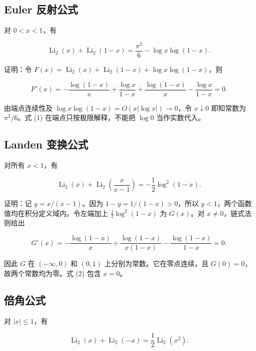 \documentclass[11pt,a4paper]{article}
\begin{document}
\hypertarget{euler-ux53cdux5c04ux516cux5f0f}{%
\subsection{Euler 反射公式}\label{euler-ux53cdux5c04ux516cux5f0f}}

对 \(0<x<1\)，有

\begin{equation}
\operatorname{Li}_2(x)+\operatorname{Li}_2(1-x)
=\frac{\pi^2}{6}-\log x\log(1-x).
\tag{1}
\end{equation}

证明：令 \(F(x)=\operatorname{Li}_2(x)+\operatorname{Li}_2(1-x)+\log x\log(1-x)\)，则

\[
F'(x)=-\frac{\log(1-x)}x+\frac{\log x}{1-x}
+\frac{\log(1-x)}x-\frac{\log x}{1-x}=0.
\]

由端点连续性及 \(\log x\log(1-x)=O(x|\log x|)\to0\)，令 \(x\downarrow0\) 即知常数为 \(\pi^2/6\)。式 (1) 在端点只按极限解释，不能把 \(\log0\) 当作实数代入。

\hypertarget{landen-ux53d8ux6362ux516cux5f0f}{%
\subsection{Landen 变换公式}\label{landen-ux53d8ux6362ux516cux5f0f}}

对所有 \(x<1\)，有

\begin{equation}
\operatorname{Li}_2(x)+\operatorname{Li}_2\!\left(\frac{x}{x-1}\right)
=-\frac12\log^2(1-x).
\tag{2}
\end{equation}

证明：记 \(y=x/(x-1)\)。因为 \(1-y=1/(1-x)>0\)，所以 \(y<1\)，两个函数值均在积分定义域内。令左端加上 \(\tfrac12\log^2(1-x)\) 为 \(G(x)\)。对 \(x\ne0\)，链式法则给出

\[
G'(x)=-\frac{\log(1-x)}x
+\frac{\log(1-x)}{x(1-x)}
-\frac{\log(1-x)}{1-x}=0.
\]

因此 \(G\) 在 \((-\infty,0)\) 和 \((0,1)\) 上分别为常数。它在零点连续，且 \(G(0)=0\)，故两个常数均为零。式 (2) 包含 \(x=0\)。

\hypertarget{ux500dux89d2ux516cux5f0f}{%
\subsection{倍角公式}\label{ux500dux89d2ux516cux5f0f}}

对 \(|x|\leqslant1\)，有

\begin{equation}
\operatorname{Li}_2(x)+\operatorname{Li}_2(-x)
=\frac12\operatorname{Li}_2(x^2).
\tag{3}
\end{equation}
\end{document}
